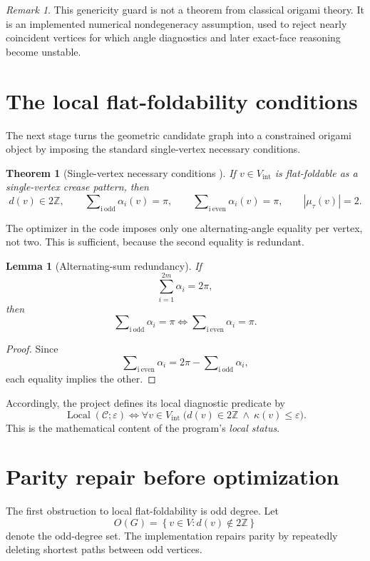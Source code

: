 \documentclass[11pt]{article}
\newtheorem{lemma}[definition]{Lemma}
\newtheorem{theorem}[definition]{Theorem}
\theoremstyle{remark}
\newtheorem{remark}[definition]{Remark}
\newcommand{\ZZ}{\mathbb{Z}}
\newcommand{\CP}{\mathcal{C}}
\newcommand{\eps}{\varepsilon}
\newcommand{\abs}[1]{\left\lvert #1 \right\rvert}
\newcommand{\set}[1]{\left\{ #1 \right\}}
\newcommand{\odd}{\operatorname*{\sum\nolimits_{i\ \mathrm{odd}}}}
\newcommand{\even}{\operatorname*{\sum\nolimits_{i\ \mathrm{even}}}}
\begin{document}
\begin{remark}
This genericity guard is not a theorem from classical origami theory. It is an
implemented numerical nondegeneracy assumption, used to reject nearly
coincident vertices for which angle diagnostics and later exact-face reasoning
become unstable.
\end{remark}

\section{The local flat-foldability conditions}

The next stage turns the geometric candidate graph into a constrained origami
object by imposing the standard single-vertex necessary conditions.

\begin{theorem}[Single-vertex necessary conditions {\cite{hull_math_flat}}]
If $v\in V_{\mathrm{int}}$ is flat-foldable as a single-vertex crease pattern,
then
\[
d(v)\in 2\ZZ,
\qquad
\odd \alpha_i(v)=\pi,
\qquad
\even \alpha_i(v)=\pi,
\qquad
\abs{\mu_\tau(v)}=2.
\]
\end{theorem}

The optimizer in the code imposes only one alternating-angle equality per
vertex, not two. This is sufficient, because the second equality is redundant.

\begin{lemma}[Alternating-sum redundancy]
If
\[
\sum_{i=1}^{2m}\alpha_i=2\pi,
\]
then
\[
\odd \alpha_i=\pi
\Longleftrightarrow
\even \alpha_i=\pi.
\]
\end{lemma}

\begin{proof}
Since
\[
\even \alpha_i = 2\pi-\odd \alpha_i,
\]
each equality implies the other.
\end{proof}

Accordingly, the project defines its local diagnostic predicate by
\[
\operatorname{Local}(\CP;\eps)
\Longleftrightarrow
\forall v\in V_{\mathrm{int}}\;
\bigl(
d(v)\in 2\ZZ
\ \wedge\
\kappa(v)\le \eps
\bigr).
\]
This is the mathematical content of the program's \emph{local status}.

\section{Parity repair before optimization}

The first obstruction to local flat-foldability is odd degree. Let
\[
O(G)=\set{v\in V:d(v)\notin 2\ZZ}
\]
denote the odd-degree set. The implementation repairs parity by repeatedly
deleting shortest paths between odd vertices.
\end{document}
